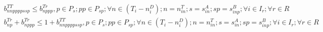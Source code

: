 \begin{align}
  & b_{n np p pp s sp}^{T T} \leq b_{np pp}^{T r} , p \in \mathbf{\mathit{P}}_{s} ; pp \in \mathbf{\mathit{P}}_{sp} ; \forall n \in \left(\mathbf{\mathit{T}}_{i} - n_{i}^{D}\right) ; n = n_{\mathit{in}}^{T} ; s = s_{\mathit{in}}^{A} ; sp = s_{i np}^{B} ; \forall i \in \mathbf{\mathit{I}}_{r} ; \forall r \in \mathbf{\mathit{R}} \tag{eq\_0043\_b} \\
  & b_{\mathit{np}}^{T r} + b_{np pp}^{T r} \leq 1 + b_{n np p pp s sp}^{T T} , p \in \mathbf{\mathit{P}}_{s} ; pp \in \mathbf{\mathit{P}}_{sp} ; \forall n \in \left(\mathbf{\mathit{T}}_{i} - n_{i}^{D}\right) ; n = n_{\mathit{in}}^{T} ; s = s_{\mathit{in}}^{A} ; sp = s_{i np}^{B} ; \forall i \in \mathbf{\mathit{I}}_{r} ; \forall r \in \mathbf{\mathit{R}} \tag{eq\_0043\_c} \\
\end{align}
